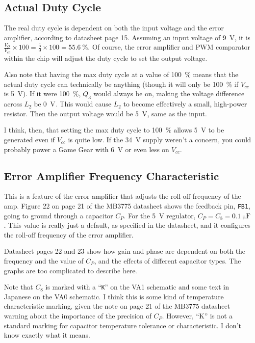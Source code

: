 \documentclass{article}
\newcommand{\Vcc}{$V_{cc}$}
\newcommand{\chippin}{\texttt}
\newcommand{\model}{\textsf}
\begin{document}
\subsection{Actual Duty Cycle}
The real duty cycle is dependent on both the input voltage and the
error amplifier, according to datasheet page 15. Assuming an input
voltage of \qty{9}{\volt}, it is
$\frac{V_O}{V_{cc}}\times{}100 = \frac{5}{9}\times{}100 =
\qty{55.6}{\%}$. Of course, the error amplifier and PWM comparator
within the chip will adjust the duty cycle to set the output voltage.

Also note that having the max duty cycle at a value of \qty{100}{\%}
means that the actual duty cycle can technically be anything (though
it will only be \qty{100}{\%} if \Vcc{} is \qty{5}{\volt}). If it were
\qty{100}{\%}, $Q_3$ would always be on, making the voltage difference
across $L_2$ be \qty{0}{\volt}. This would cause $L_2$ to become
effectively a small, high-power resistor. Then the output voltage
would be \qty{5}{\volt}, same as the input.

I think, then, that setting the max duty cycle to \qty{100}{\%} allows
\qty{5}{\volt} to be generated even if \Vcc{} is quite low. If the
\qty{34}{\volt} supply weren't a concern, you could probably power a
Game Gear with \qty{6}{\volt} or even less on \Vcc{}.


\subsection{Error Amplifier Frequency Characteristic}
\label{sec:5v_error_amp_char}
This is a feature of the error amplifier that adjusts the roll-off
frequency of the amp. Figure 22 on page 21 of the \model{MB3775}
datasheet shows the feedback pin, \chippin{FB1}, going to ground
through a capacitor $C_P$. For the \qty{5}{\volt} regulator,
$C_P = C_8 = \qty{0.1}{\micro\farad}$. This value is really just a
default, as specified in the datasheet, and it configures the roll-off
frequency of the error amplifier.

Datasheet pages 22 and 23 show how gain and phase are dependent on
both the frequency and the value of $C_P$, and the effects of
different capacitor types. The graphs are too complicated to describe
here.

Note that $C_8$ is marked with a ``\texttt{K}'' on the \model{VA1}
schematic and some text in Japanese on the \model{VA0} schematic. I
think this is some kind of temperature characteristic marking, given
the note on page 21 of the \model{MB3775} datasheet warning about the
importance of the precision of $C_P$. However, ``K'' is not a standard
marking for capacitor temperature tolerance or characteristic. I don't
know exactly what it means.
\end{document}

